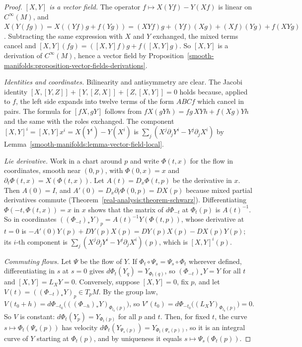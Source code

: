 \begin{proof}
\emph{$[X, Y]$ is a vector field.} The operator $f \mapsto X(Yf) - Y(Xf)$ is linear on $C^\infty(M)$, and
$X(Y(fg)) = X((Yf)g + f(Yg)) = (XYf)g + (Yf)(Xg) + (Xf)(Yg) + f(XYg)$. Subtracting the same expression with $X$ and $Y$ exchanged, the mixed terms cancel and
$[X, Y](fg) = ([X, Y]f)g + f([X, Y]g)$. So $[X, Y]$ is a derivation of $C^\infty(M)$, hence a vector field by
Proposition~\ref{smooth-manifolds:proposition-vector-fields-derivations}.

\emph{Identities and coordinates.} Bilinearity and antisymmetry are clear. The Jacobi identity $[X, [Y, Z]] + [Y, [Z, X]] + [Z, [X, Y]] = 0$ holds because,
applied to $f$, the left side expands into twelve terms of the form $ABCf$ which cancel in pairs. The formula for $[fX, gY]$ follows from
$fX(gYh) = fg\,XYh + f(Xg)Yh$ and the same with the roles exchanged. The component $[X, Y]^i = [X, Y]x^i = X(Y^i) - Y(X^i)$ is
$\sum_j(X^j\partial_jY^i - Y^j\partial_jX^i)$ by Lemma~\ref{smooth-manifolds:lemma-vector-field-local}.

\emph{Lie derivative.} Work in a chart around $p$ and write $\Phi(t, x)$ for the flow in coordinates, smooth near $(0, p)$, with $\Phi(0, x) = x$ and
$\partial_t\Phi(t, x) = X(\Phi(t, x))$. Let $A(t) = D_x\Phi(t, p)$ be the derivative in $x$. Then $A(0) = I$, and $A'(0) = D_x\partial_t\Phi(0, p) = DX(p)$ because
mixed partial derivatives commute (Theorem~\ref{real-analysis:theorem-schwarz}). Differentiating $\Phi(-t, \Phi(t, x)) = x$ in $x$ shows that the matrix of
$d\Phi_{-t}$ at $\Phi_t(p)$ is $A(t)^{-1}$. So in coordinates $((\Phi_{-t})_*Y)_p = A(t)^{-1}Y(\Phi(t, p))$, whose derivative at $t = 0$ is
$-A'(0)Y(p) + DY(p)X(p) = DY(p)X(p) - DX(p)Y(p)$; its $i$-th component is $\sum_j(X^j\partial_jY^i - Y^j\partial_jX^i)(p)$, which is $[X, Y]^i(p)$.

\emph{Commuting flows.} Let $\Psi$ be the flow of $Y$. If $\Phi_t \circ \Psi_s = \Psi_s \circ \Phi_t$ wherever defined, differentiating in $s$ at $s = 0$ gives
$d\Phi_t(Y_q) = Y_{\Phi_t(q)}$, so $(\Phi_{-t})_*Y = Y$ for all $t$ and $[X, Y] = L_XY = 0$. Conversely, suppose $[X, Y] = 0$, fix $p$, and let
$V(t) = ((\Phi_{-t})_*Y)_p \in T_pM$. By the group law, $V(t_0 + h) = d\Phi_{-t_0}\bigl(((\Phi_{-h})_*Y)_{\Phi_{t_0}(p)}\bigr)$, so
$V'(t_0) = d\Phi_{-t_0}\bigl((L_XY)_{\Phi_{t_0}(p)}\bigr) = 0$. So $V$ is constant: $d\Phi_t(Y_p) = Y_{\Phi_t(p)}$ for all $p$ and $t$. Then, for fixed $t$, the
curve $s \mapsto \Phi_t(\Psi_s(p))$ has velocity $d\Phi_t(Y_{\Psi_s(p)}) = Y_{\Phi_t(\Psi_s(p))}$, so it is an integral curve of $Y$ starting at $\Phi_t(p)$, and
by uniqueness it equals $s \mapsto \Psi_s(\Phi_t(p))$.
\end{proof}

